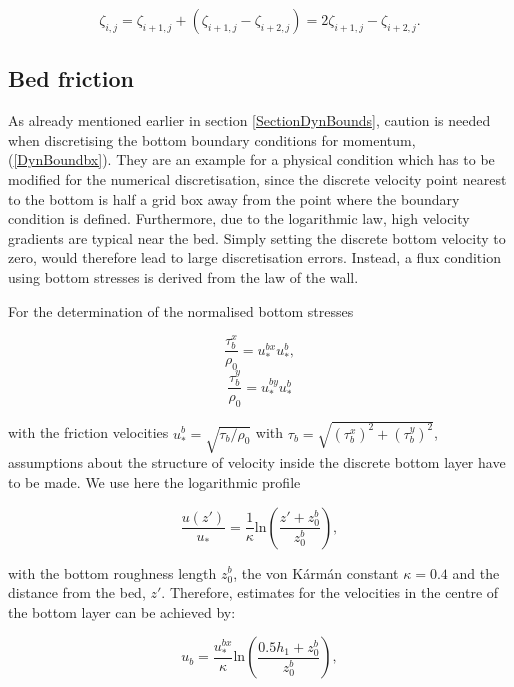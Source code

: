 \begin{equation}
\zeta_{i,j}=\zeta_{i+1,j}+(\zeta_{i+1,j}-\zeta_{i+2,j})=
2\zeta_{i+1,j}-\zeta_{i+2,j}. 
\end{equation}


\subsection{Bed friction}\label{SectionBedFric}
 
As already mentioned earlier in section \ref{SectionDynBounds},
caution is needed when discretising the
bottom boundary conditions for momentum, (\ref{DynBoundbx}).
They are an example
for a physical condition which has to be modified for the numerical
discretisation, since the discrete velocity point nearest to the bottom
is half a grid box away from the point where the
boundary condition
is defined. Furthermore, due to the logarithmic 
law, high velocity
gradients are typical near the bed. Simply setting the discrete bottom
velocity to zero, would therefore lead to large discretisation errors.
Instead, a flux condition using bottom stresses is derived from the 
law of the wall.

For the determination of the normalised bottom stresses

\begin{equation}\label{tauxb}
\frac{\tau^x_b}{\rho_0}=u_*^{bx}u_*^b,
\end{equation}
\begin{equation}\label{tauyb}
\frac{\tau^y_b}{\rho_0}=u_*^{by}u_*^b
\end{equation}

with the friction velocities
$u_*^b=\sqrt{\tau_b/\rho_0}$\label{pagetaub} with
$\tau_b=\sqrt{(\tau^x_{b})^2+(\tau^y_{b})^2}$,
assumptions about the structure of
velocity inside the discrete bottom layer have to be made.
We use here the logarithmic profile 

\begin{equation}\label{log_prof}
\frac{u(z')}{u_*}
=\frac{1}{\kappa}\mbox{ln}\left(\frac{z'+z_0^b}{z_0^b}\right),
\end{equation}

with the bottom roughness length $z_0^b$, the von K\'arm\'an constant $\kappa=0.4$
and the distance from the bed, $z'$. 
Therefore, estimates for the velocities in the centre of the bottom
layer can be achieved by:

\begin{equation}\label{ulogdis}
u_b = \frac{u_*^{bx}}{\kappa}\mbox{ln} \left(\frac{0.5h_1+z_0^b}{z_0^b}\right),
\end{equation}

